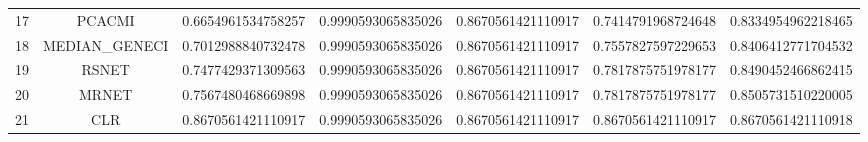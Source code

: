 \documentclass[a4paper,10pt]{article}
\begin{document}
\begin{landscape}
\begin{table}[!htp]
\begin{tabular}{ccccccc}
17&PCACMI&0.6654961534758257&0.9990593065835026&0.8670561421110917&0.7414791968724648&0.8334954962218465\\
18&MEDIAN_GENECI&0.7012988840732478&0.9990593065835026&0.8670561421110917&0.7557827597229653&0.8406412771704532\\
19&RSNET&0.7477429371309563&0.9990593065835026&0.8670561421110917&0.7817875751978177&0.8490452466862415\\
20&MRNET&0.7567480468669898&0.9990593065835026&0.8670561421110917&0.7817875751978177&0.8505731510220005\\
21&CLR&0.8670561421110917&0.9990593065835026&0.8670561421110917&0.8670561421110917&0.8670561421110918\\
\hline
\end{tabular}
\end{table}

\end{landscape}
\end{document}

